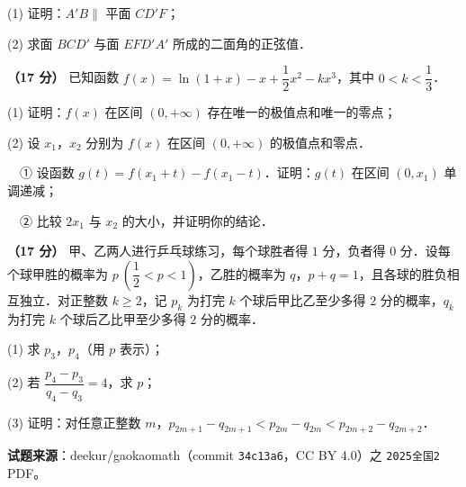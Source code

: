 \begin{center}\end{center}

  (1) 证明：$A'B\parallel$ 平面 $CD'F$；

  (2) 求面 $BCD'$ 与面 $EFD'A'$ 所成的二面角的正弦值．

\textbf{（17 分）} 已知函数 $f(x)=\ln(1+x)-x+\dfrac12x^2-kx^3$，其中 $0<k<\dfrac13$．

  (1) 证明：$f(x)$ 在区间 $(0,+\infty)$ 存在唯一的极值点和唯一的零点；

  (2) 设 $x_1$，$x_2$ 分别为 $f(x)$ 在区间 $(0,+\infty)$ 的极值点和零点．

  　① 设函数 $g(t)=f(x_1+t)-f(x_1-t)$．证明：$g(t)$ 在区间 $(0,x_1)$ 单调递减；

  　② 比较 $2x_1$ 与 $x_2$ 的大小，并证明你的结论．

\textbf{（17 分）} 甲、乙两人进行乒乓球练习，每个球胜者得 $1$ 分，负者得 $0$ 分．设每个球甲胜的概率为 $p\ \left(\dfrac12<p<1\right)$，乙胜的概率为 $q$，$p+q=1$，且各球的胜负相互独立．对正整数 $k\ge 2$，记 $p_k$ 为打完 $k$ 个球后甲比乙至少多得 $2$ 分的概率，$q_k$ 为打完 $k$ 个球后乙比甲至少多得 $2$ 分的概率．

  (1) 求 $p_3$，$p_4$（用 $p$ 表示）；

  (2) 若 $\dfrac{p_4-p_3}{q_4-q_3}=4$，求 $p$；

  (3) 证明：对任意正整数 $m$，$p_{2m+1}-q_{2m+1}<p_{2m}-q_{2m}<p_{2m+2}-q_{2m+2}$．

\par\medskip

\begin{gktip}
\textbf{试题来源}：deekur/gaokaomath（commit \texttt{34c13a6}，CC BY 4.0）之 \texttt{2025全国2} PDF。
\end{gktip}
